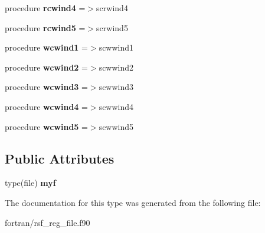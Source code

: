 \begin{DoxyCompactItemize}
procedure {\bfseries rcwind4} =$>$scrwind4
\item 
\mbox{\label{structrsf__regfile__mod_1_1rsffile_aca7cbc9d89c75740c0ee677f5aab13fa}} 
procedure {\bfseries rcwind5} =$>$scrwind5
\item 
\mbox{\label{structrsf__regfile__mod_1_1rsffile_ab9eaffdd6ad56056c960c035be77e37f}} 
procedure {\bfseries wcwind1} =$>$scwwind1
\item 
\mbox{\label{structrsf__regfile__mod_1_1rsffile_a31f46b45165b131832637ea81710e4db}} 
procedure {\bfseries wcwind2} =$>$scwwind2
\item 
\mbox{\label{structrsf__regfile__mod_1_1rsffile_a5b8c50dc9df9b248d78e48f81103c055}} 
procedure {\bfseries wcwind3} =$>$scwwind3
\item 
\mbox{\label{structrsf__regfile__mod_1_1rsffile_a5726c278fe1932f218654fab772f6569}} 
procedure {\bfseries wcwind4} =$>$scwwind4
\item 
\mbox{\label{structrsf__regfile__mod_1_1rsffile_a976cfcb59e15b82d425a678f65e5fe62}} 
procedure {\bfseries wcwind5} =$>$scwwind5
\end{DoxyCompactItemize}
\subsection*{Public Attributes}
\begin{DoxyCompactItemize}
\item 
\mbox{\label{structrsf__regfile__mod_1_1rsffile_a844e64e16ef1aee811633e426dd1ab23}} 
type(file) {\bfseries myf}
\end{DoxyCompactItemize}


The documentation for this type was generated from the following file\+:\begin{DoxyCompactItemize}
\item 
fortran/rsf\+\_\+reg\+\_\+file.\+f90\end{DoxyCompactItemize}
